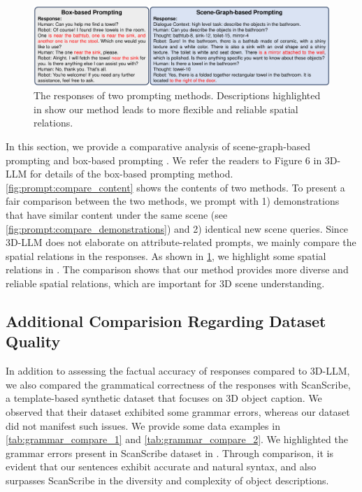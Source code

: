 \begin{figure}[!t]
\centering
\includegraphics[width=\textwidth, keepaspectratio]{figs/dialogue_compare_responses.pdf}%
  \caption{The responses of two prompting methods. Descriptions highlighted in {\color{red}{red}} show our method leads to more flexible and reliable spatial relations.}
  \label{fig:prompt:compare_responses}
\end{figure}

In this section, we provide a comparative analysis of scene-graph-based prompting and box-based prompting \citep{hong20233d}. We refer the readers to Figure 6 in 3D-LLM \citep{hong20233d} for details of the box-based prompting method. \cref{fig:prompt:compare_content} shows the contents of two methods. To present a fair comparison between the two methods, we prompt with 1) demonstrations that have similar content under the same scene (see \cref{fig:prompt:compare_demonstrations}) and 2) identical new scene queries. Since 3D-LLM does not elaborate on attribute-related prompts, we mainly compare the spatial relations in the responses. As shown in \cref{fig:prompt:compare_responses}, we highlight some spatial relations in {\color{red}{red}}. The comparison shows that our method provides more diverse and reliable spatial relations, which are important for 3D scene understanding.

\subsection{Additional Comparision Regarding Dataset Quality}
\label{app:additional_data_comparison}
In addition to assessing the factual accuracy of responses compared to 3D-LLM, we also compared the grammatical correctness of the responses with ScanScribe\cite{zhu20233d}, a template-based synthetic dataset that focuses on 3D object caption. We observed that their dataset exhibited some grammar errors, whereas our dataset did not manifest such issues. We provide some data examples in \cref{tab:grammar_compare_1} and \cref{tab:grammar_compare_2}. We highlighted the grammar errors present in ScanScribe dataset in {\color{red}{red}}. Through comparison, it is evident that our sentences exhibit accurate and natural syntax, and also surpasses ScanScribe in the diversity and complexity of object descriptions.

